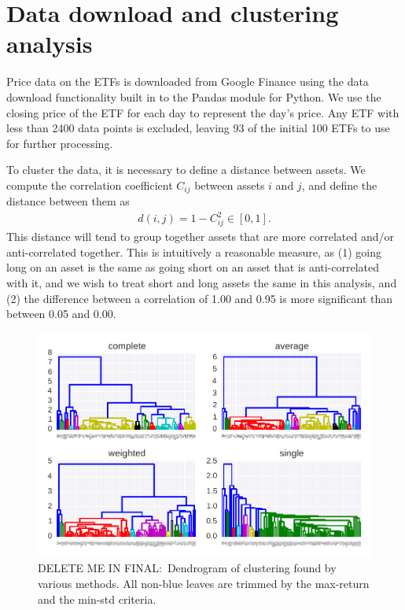 \section{Data download and clustering analysis}

Price data on the ETFs is downloaded from Google Finance using the data download functionality built in to the Pandas module for Python.
We use the closing price of the ETF for each day to represent the day's price.
Any ETF with less than 2400 data points is excluded, leaving 93 of the initial 100 ETFs to use for further processing.

To cluster the data, it is necessary to define a distance between assets. We compute the correlation coefficient $C_{ij}$ between assets $i$ and $j$, and define the distance between them as
\begin{gather}
d(i,j) = 1 - C_{ij}^2  \in [0, 1].
\end{gather}
This distance will tend to group together assets that are more correlated and/or anti-correlated together.
This is intuitively a reasonable measure, as (1) going long on an asset is the same as going short on an asset that is anti-correlated with it, and we wish to treat short and long assets the same in this analysis, and (2) the difference between a correlation of 1.00 and 0.95 is more significant than between 0.05 and 0.00.


\begin{figure}[tp]
\centering
\includegraphics{pic/dendro_methods.pdf}
\caption{DELETE ME IN FINAL:\ Dendrogram of clustering found by various methods. All non-blue leaves are trimmed by the max-return and the min-std criteria.}
\label{fig:dendrogram}
\end{figure}

